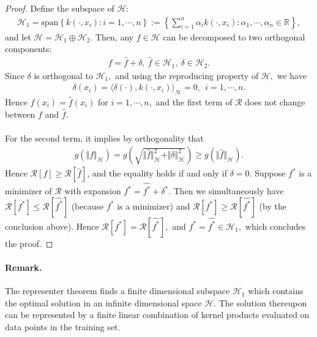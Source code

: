 \documentclass{article}
\begin{document}
\begin{proof}
Define the subspace of $\mathcal{H}$:
\begin{align*}
	\mathcal{H}_1 = \mathrm{span}\left\lbrace k(\cdot,x_i): i=1,\cdots,n\right\rbrace := \left\lbrace \sum_{i=1}^n\alpha_i k(\cdot,x_i): \alpha_1,\cdots,\alpha_n\in\mathbb{R}\right\rbrace,\tag{6.10}
\end{align*}
and let $\mathcal{H}=\mathcal{H}_1\oplus\mathcal{H}_2.$ Then, any $f\in\mathcal{H}$ can be decomposed to two orthogonal components:
\begin{align*}
	f=\widehat{f} + \delta,\ \widehat{f}\in\mathcal{H}_1,\ \delta\in\mathcal{H}_2.\tag{6.11}
\end{align*}
Since $\delta$ is orthogonal to $\mathcal{H}_1,$ and using the reproducing property of $\mathcal{H},$ we have
\begin{align*}
	\delta(x_i) = \langle\delta(\cdot), k(\cdot,x_i)\rangle_\mathcal{H} = 0,\ \ i=1,\cdots,n.\tag{6.12}
\end{align*}
Hence $f(x_i)=\widehat{f}(x_i)$ for $i=1,\cdots,n,$ and the first term of $\mathcal{R}$ does not change between $f$ and $\widehat{f}.$

\paragraph{} For the second term, it implies by orthogonality that
\begin{align*}
	g(\Vert f\Vert_\mathcal{H}) = g\left(\sqrt{\Vert \widehat{f}\Vert_\mathcal{H}^2 + \Vert\delta\Vert_\mathcal{H}^2}\right) \geq g\left(\Vert\widehat{f}\Vert_\mathcal{H}\right).\tag{6.13}
\end{align*}
Hence $\mathcal{R}[f]\geq\mathcal{R}[\widehat{f}]$, and the equality holds if and only if $\delta = 0.$  Suppose $f^{*}$ is a minimizer of $\mathcal{R}$ with expansion $f^{*} = \widehat{f^{*}} + \delta^{*}.$ Then we simultaneously have $\mathcal{R}[f^*]\leq \mathcal{R}[\widehat{f^{*}}]$ (because $f^{*}$ is a minimizer) and $\mathcal{R}[f^*]\geq \mathcal{R}[\widehat{f^{*}}]$ (by the conclusion above). Hence $\mathcal{R}[f^*] = \mathcal{R}[\widehat{f^{*}}],$ and
$f^{*}=\widehat{f^{*}}\in\mathcal{H}_1,$ which concludes the proof.
\end{proof} 

\paragraph{Remark.} The representer theorem finds a finite dimensional subspace $\mathcal{H}_1$ which contains the optimal solution in an infinite dimensional space $\mathcal{H}.$ The solution thereupon can be represented by a finite linear combination of kernel products evaluated on data points in the training set.
\end{document}
